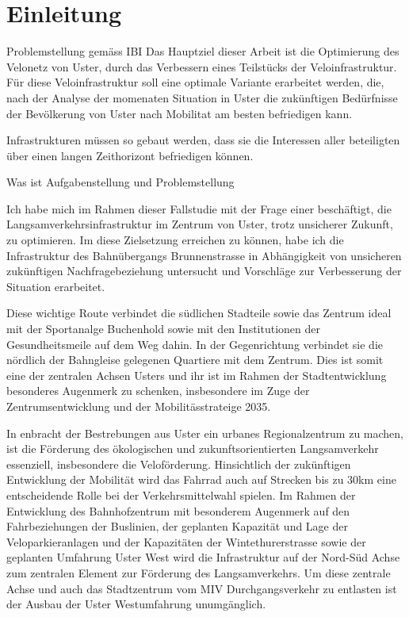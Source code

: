 %
%            
%
%
%

\chapter{Einleitung}
\label{chap:Einleitung}

Problemstellung gemäss IBI
Das Hauptziel dieser Arbeit ist die Optimierung des Velonetz von Uster, durch das Verbessern eines Teilstücks der Veloinfrastruktur. Für diese Veloinfrastruktur soll eine optimale Variante erarbeitet werden, die, nach der Analyse der momenaten Situation in Uster die zukünftigen Bedürfnisse der Bevölkerung von Uster nach Mobilitat am besten befriedigen kann.

Infrastrukturen müssen so gebaut werden, dass sie die Interessen aller beteiligten über einen langen Zeithorizont befriedigen können.

Was ist Aufgabenstellung und Problemstellung

Ich habe mich im Rahmen dieser Fallstudie mit der Frage einer beschäftigt, die Langsamverkehrsinfrastruktur im Zentrum von Uster, trotz unsicherer Zukunft, zu optimieren. Im diese Zielsetzung erreichen zu können, habe ich die Infrastruktur des Bahnübergangs Brunnenstrasse in Abhängigkeit von unsicheren zukünftigen Nachfragebeziehung untersucht und Vorschläge zur Verbesserung der Situation erarbeitet.

Diese wichtige Route verbindet die südlichen Stadteile sowie das Zentrum ideal mit der Sportanalge Buchenhold sowie mit den Institutionen der Gesundheitsmeile auf dem Weg dahin. In der Gegenrichtung verbindet sie die nördlich der Bahngleise gelegenen Quartiere mit dem Zentrum. Dies ist somit eine der zentralen Achsen Usters und ihr ist im Rahmen der Stadtentwicklung besonderes Augenmerk zu schenken, insbesondere im Zuge der Zentrumsentwicklung und der Mobilitässtrateige 2035. 

In enbracht der Bestrebungen aus Uster ein urbanes Regionalzentrum zu machen, ist die Förderung des ökologischen und zukunftsorientierten Langsamverkehr essenziell, insbesondere die Veloförderung. Hinsichtlich der zukünftigen Entwicklung der Mobilität wird das Fahrrad auch auf Strecken bis zu 30km eine entscheidende Rolle bei der Verkehrsmittelwahl spielen. 
Im Rahmen der Entwicklung des Bahnhofzentrum mit besonderem Augenmerk auf den Fahrbeziehungen der Buslinien, der geplanten Kapazität und Lage der Veloparkieranlagen und der Kapazitäten der Wintethurerstrasse sowie der geplanten Umfahrung Uster West wird die Infrastruktur auf der Nord-Süd Achse zum zentralen Element zur Förderung des Langsamverkehrs. Um diese zentrale Achse und auch das Stadtzentrum vom MIV Durchgangsverkehr zu entlasten ist der Ausbau der Uster Westumfahrung unumgänglich. 


